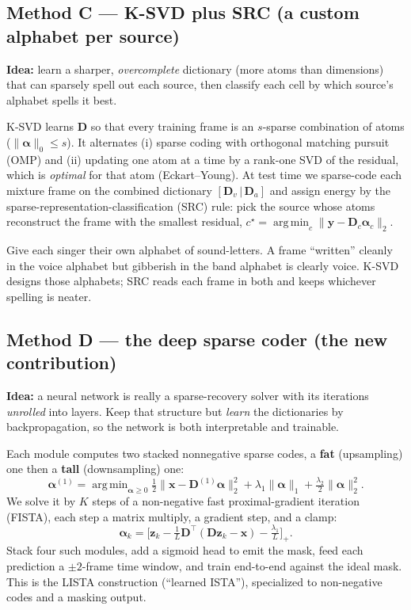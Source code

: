 \documentclass[11pt]{article}
\newcommand{\norm}[1]{\lVert#1\rVert}
\DeclareMathOperator*{\argmin}{arg\,min}
\begin{document}
\subsection{Method C --- K-SVD plus SRC (a custom alphabet per source)}
\textbf{Idea:} learn a sharper, \emph{overcomplete} dictionary (more atoms than
dimensions) that can sparsely spell out each source, then classify each cell by
which source's alphabet spells it best.

\begin{slowmath}
K-SVD learns $\bm D$ so that every training frame is an $s$-sparse combination of
atoms ($\norm{\bm\alpha}_0\le s$). It alternates (i) sparse coding with orthogonal
matching pursuit (OMP) and (ii) updating one atom at a time by a rank-one SVD of the
residual, which is \emph{optimal} for that atom (Eckart--Young). At test time we
sparse-code each mixture frame on the combined dictionary $[\bm D_v\,|\,\bm D_a]$ and
assign energy by the sparse-representation-classification (SRC) rule: pick the
source whose atoms reconstruct the frame with the smallest residual,
$c^\star=\argmin_c\norm{\bm y-\bm D_c\bm\alpha_c}_2$.
\end{slowmath}

\begin{analogy}
Give each singer their own alphabet of sound-letters. A frame ``written'' cleanly
in the voice alphabet but gibberish in the band alphabet is clearly voice. K-SVD
designs those alphabets; SRC reads each frame in both and keeps whichever spelling
is neater.
\end{analogy}

\subsection{Method D --- the deep sparse coder (the new contribution)}
\textbf{Idea:} a neural network is really a sparse-recovery solver with its
iterations \emph{unrolled} into layers. Keep that structure but \emph{learn} the
dictionaries by backpropagation, so the network is both interpretable and trainable.

\begin{slowmath}
Each module computes two stacked nonnegative sparse codes, a \textbf{fat}
(upsampling) one then a \textbf{tall} (downsampling) one:
\[
\bm\alpha^{(1)}=\argmin_{\bm\alpha\ge0}\tfrac12\norm{\bm x-\bm D^{(1)}\bm\alpha}_2^2
+\lambda_1\norm{\bm\alpha}_1+\tfrac{\lambda_2}2\norm{\bm\alpha}_2^2 .
\]
We solve it by $K$ steps of a non-negative fast proximal-gradient iteration (FISTA),
each step a matrix multiply, a gradient step, and a clamp:
\[
\bm\alpha_k=\Big[\bm z_k-\tfrac1L\bm D^\top(\bm D\bm z_k-\bm x)-\tfrac{\lambda_1}L\Big]_+ .
\]
Stack four such modules, add a sigmoid head to emit the mask, feed each prediction a
$\pm2$-frame time window, and train end-to-end against the ideal mask. This is the
LISTA construction (``learned ISTA''), specialized to non-negative codes and a
masking output.
\end{slowmath}
\end{document}
